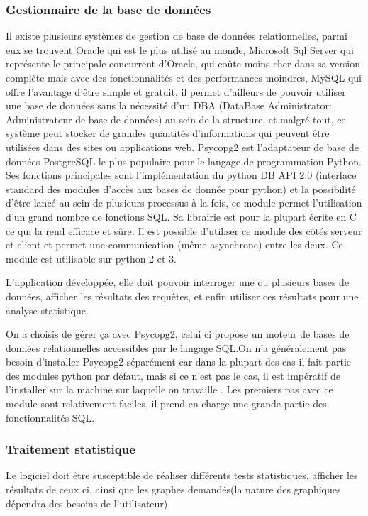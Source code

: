 \documentclass[a4paper]{report}
\begin{document}
\subsubsection{Gestionnaire de la base de données}

Il existe plusieurs systèmes de gestion de base de données relationnelles, parmi eux se trouvent Oracle\cite{ref20} qui est le plus utilisé au monde, Microsoft Sql Server\cite{ref22} qui représente le principale concurrent d’Oracle, qui coûte moins cher dans sa version complète mais avec des  fonctionnalités et des performances moindres, MySQL\cite{ref23} qui offre l’avantage d’être simple et gratuit, il permet d’ailleurs de pouvoir utiliser une base de données sans la nécessité d’un DBA (DataBase Administrator: Administrateur de base de données) au sein de la structure, et malgré tout, ce système peut stocker de grandes quantités d’informations qui peuvent être utilisées dans des sites ou applications web. Psycopg2\cite{ref21} est l’adaptateur de base de données PostgreSQL le plus populaire pour le langage de programmation Python. Ses fonctions principales sont l’implémentation du python DB API 2.0 (interface standard des modules d’accès aux bases de donnée pour python) et la possibilité d’être lancé au sein de plusieurs processus à la fois, ce module permet l’utilisation d’un grand nombre de fonctions SQL. Sa librairie est pour la plupart écrite en C ce qui la rend efficace et sûre. Il est possible d’utiliser ce module des côtés serveur et client et permet une communication (même asynchrone) entre les deux. Ce module est utilisable sur python 2 et 3.

L’application développée, elle doit pouvoir interroger une ou plusieurs bases de données, afficher les résultats des requêtes, et enfin utiliser ces résultats pour une analyse statistique. 

On a choisis de gérer ça avec Psycopg2, celui ci propose un moteur de bases de données relationnelles accessibles par le langage SQL.On n'a généralement pas besoin d'installer Psycopg2 séparément car dans la plupart des cas il fait partie des modules python par défaut, mais si ce n'est pas le cas, il est impératif de l'installer sur la machine sur laquelle on travaille . Les premiers pas avec ce module sont relativement faciles, il prend en charge une grande partie des fonctionnalités SQL.
 

\subsubsection{Traitement statistique}
Le logiciel doit être susceptible de réaliser différents tests statistiques, afficher les résultats de ceux ci, ainsi que les graphes demandés(la nature des graphiques dépendra des besoins de l'utilisateur).
\end{document}
